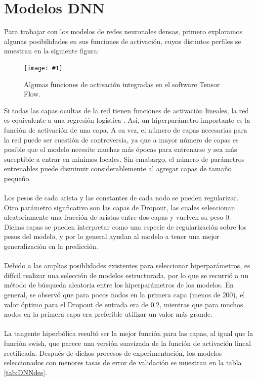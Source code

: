 \documentclass[11pt]{article}
\newcommand{\figura}[3]{\begin{figure}[H] \centering \texttt{[image: \#1]} \caption{#2} \label{#1}  \end{figure}}
\begin{document}
\section{Modelos DNN}
Para trabajar con los modelos de redes neuronales densas, primero exploramos algunas posibilidades en sus funciones de activación, cuyos distintos perfiles se muestran en la siguiente figura:
\figura{activations.pdf}{Algunas funciones de activación integradas en el software Tensor Flow.}{width = 0.5\textwidth}
Si todas las capas ocultas de la red tienen funciones de activación lineales, la red es equivalente a una regresión logística \cite{Goodfellow}. Así, un hiperparámetro importante es la función de activación de una capa. A su vez, el número de capas necesarias para la red puede ser cuestión de controversia, ya que a mayor número de capas es posible que el modelo necesite muchas más épocas para entrenarse y sea más suceptible a entrar en mínimos locales. Sin emabargo, el número de parámetros entrenables puede disminuir considerablemente al agregar capas de tamaño pequeño.
\\
\\Los pesos de cada arista y las constantes de cada nodo se pueden regularizar. Otro parámetro signficativo son las capas de Dropout, las cuales seleccionan aleatoriamente una fracción de aristas entre dos capas y vuelven su peso 0. Dichas capas se pueden interpretar como una especie de regularización sobre los pesos del modelo, y por lo general ayudan al modelo a tener una mejor generalización en la predicción.
\\
\\Debido a las amplias posiblidades existentes para seleccionar hiperparámetros, es difícil realizar una selección de modelos estructurada, por lo que se recurrió a un método de búsqueda aleatoria entre los hiperparámetros de los modelos. En general, se observó que para pocos nodos en la primera capa (menos de 200), el valor óptimo para el Dropout de entrada era de 0.2, mientras que para muchos nodos en la primera capa era preferible utilizar un valor más grande.
\\
\\La tangente hiperbólica resultó ser la mejor función para las capas, al igual que la función swish, que parece una versión suavizada de la función de activación lineal rectificada. Después de dichos procesos de experimentación, los modelos seleccionados con menores tasas de error de validación se muestran en la tabla \ref{tab:DNNdes}.
\end{document}
